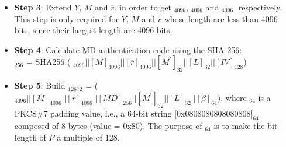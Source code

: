 \documentclass[main\_\_EN.tex]{subfiles}
\begin{document}
\begin{itemize}
    \item {\bfseries Step 3}: Extend \begin{math}Y\end{math}, \begin{math}M\end{math} and \begin{math}\overline{r}\end{math}, in order to get \begin{math}[Y]_{4096}\end{math}, \begin{math}[M]_{4096}\end{math} and \begin{math}[\overline{r}]_{4096}\end{math}, respectively. This step is only required for \begin{math}Y\end{math}, \begin{math}M\end{math} and \begin{math}\overline{r}\end{math} whose length are less than 4096 bits, since their largest length are 4096 bits.


    \item {\bfseries Step 4}: Calculate MD authentication code using the SHA-256: \\
    \begin{math}[MD]_{256}\end{math} = SHA256 (
            \begin{math}
                [Y]_{4096} ||
                [M]_{4096} ||
                [\overline{r}]_{4096} ||
                [M^{\prime}]_{32} ||
                [L]_{32} ||
                [IV]_{128}
            \end{math})

    \item {\bfseries Step 5}: Build \begin{math}[P]_{12672}\end{math} = (
            \begin{math}
                [Y]_{4096} ||
                [M]_{4096} ||
                [\overline{r}]_{4096} ||
                [MD]_{256} ||
                [M^{\prime}]_{32} ||
                [L]_{32} ||
                [\beta]_{64})
            \end{math}, where \begin{math}[\beta]_{64} \end{math} is a PKCS\#7 padding value, i.e., a 64-bit string $[$0x0808080808080808$]_{64}$ composed of 8 bytes (value = 0x80). The purpose of \begin{math}[\beta]_{64} \end{math} is to make the bit length of \begin{math}P\end{math} a multiple of 128.


\end{itemize}
\end{document}

